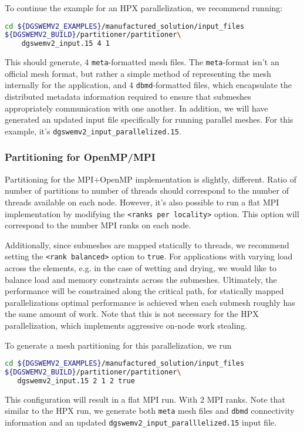 To continue the example for an HPX parallelization, we recommend running:
\begin{lstlisting}[language=bash]
cd ${DGSWEMV2_EXAMPLES}/manufactured_solution/input_files
${DGSWEMV2_BUILD}/partitioner/partitioner\
    dgswemv2_input.15 4 1
\end{lstlisting}
This should generate, 4 \lstinline{meta}-formatted mesh files. The \lstinline{meta}-format isn't an official mesh format, but rather a simple method of representing the mesh internally for the  application, and 4 \lstinline{dbmd}-formatted files, which encapsulate the distributed metadata information required to ensure that submeshes appropriately communication with one another. In addition, we will have generated an updated input file specifically for running parallel meshes. For this example, it's 
\lstinline{dgswemv2_input_parallelized.15}.

\subsubsection{Partitioning for OpenMP/MPI}
Partitioning for the MPI+OpenMP implementation is slightly, different. Ratio of number of partitions to number of threads should correspond to the number of threads available on each node. However, it's also possible to run a flat MPI implementation by modifying the \lstinline{<ranks per locality>} option. This option will correspond to the number MPI ranks on each node.

Additionally, since submeshes are mapped statically to threads, we recommend setting the \lstinline{<rank balanced>} option to \lstinline{true}. For applications with varying load across the elements, e.g. in the case of wetting and drying, we would like to balance load and memory constraints across the submeshes. Ultimately, the performance will be constrained along the critical path, for statically mapped parallelizations optimal performance is achieved when each submesh roughly has the same amount of work. Note that this is not necessary for the HPX parallelization, which implements aggressive on-node work stealing.

To generate a mesh partitioning for this parallelization, we run
\begin{lstlisting}[language=bash]
cd ${DGSWEMV2_EXAMPLES}/manufactured_solution/input_files
${DGSWEMV2_BUILD}/partitioner/partitioner\
   dgswemv2_input.15 2 1 2 true
\end{lstlisting}
This configuration will result in a flat MPI run. With 2 MPI ranks. Note that similar to the HPX run, we generate both \lstinline{meta} mesh files and \lstinline{dbmd} connectivity information and an updated \lstinline{dgswemv2_input_paralllelized.15} input file.
